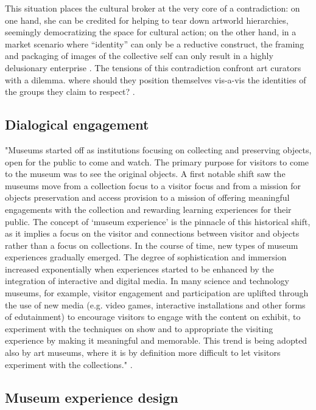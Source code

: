 This situation places the cultural broker at the very core of a contradiction: on one hand, she can be credited for helping to tear down artworld hierarchies, seemingly democratizing the space for cultural action; on the other hand, in a market scenario where “identity” can only be a reductive construct, the framing and packaging of images of the collective self can only result in a highly delusionary enterprise \autocite[p. 23-24]{Thi_book}. The tensions of this contradiction confront art curators with a dilemma. where should they position themselves vis-a-vis the identities of the groups they claim to respect? \autocite[p. 24]{Thi_book}.

\subsection{Dialogical engagement}

"Museums started off as institutions focusing on collecting and preserving objects, open for the public to come and watch. The primary purpose for visitors to come to the museum was to see the original objects. A first notable shift saw the museums move from a collection focus to a visitor focus and from a mission for objects preservation and access provision to a mission of offering meaningful engagements with the collection and rewarding learning experiences for their public. The concept of ‘museum experience’ is the pinnacle of this historical shift, as it implies a focus on the visitor and connections between visitor and objects rather than a focus on collections. In the course of time, new types of museum experiences gradually emerged. The degree of sophistication and immersion increased exponentially when experiences started to be enhanced by the integration of interactive and digital media. In many science and technology museums, for example, visitor engagement and participation are uplifted through the use of new media (e.g. video games, interactive installations and other forms of edutainment) to encourage visitors to engage with the content on exhibit, to experiment with the techniques on show and to appropriate the visiting experience by making it meaningful and memorable. This trend is being adopted also by art museums, where it is by definition more difficult to let visitors experiment with the collections." \autocite[p. 3]{vermeeren_museum_2018}.

\subsection{Museum experience design}



